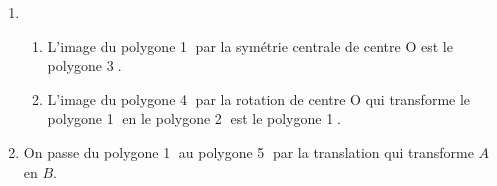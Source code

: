 
\medskip

%
%

\begin{enumerate}
\item ~

	\begin{enumerate}
		\item %
	L'image du polygone \textcircled{1} par la symétrie centrale de centre O est le polygone \textcircled{3}.
		\item %
L'image du polygone \textcircled{4} par la rotation de centre O qui transforme le polygone \textcircled{1} en le polygone \textcircled{2} est le polygone \textcircled{1}.
	\end{enumerate}
	
\item %

On passe du polygone \textcircled{1} au  polygone \textcircled{5} par la translation qui transforme $A$ en $B$.


\end{enumerate}
